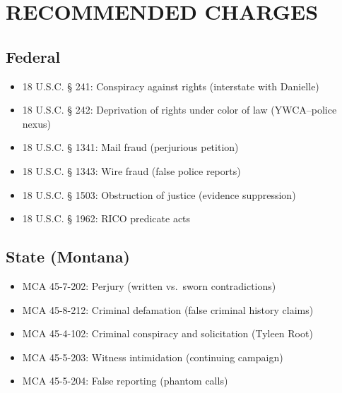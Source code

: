 \documentclass[12pt,oneside]{article}
\begin{document}
\section*{RECOMMENDED CHARGES}

\subsection*{Federal}

\begin{itemize}

\item 18 U.S.C. § 241: Conspiracy against rights (interstate with Danielle)

\item 18 U.S.C. § 242: Deprivation of rights under color of law (YWCA--police nexus)

\item 18 U.S.C. § 1341: Mail fraud (perjurious petition)

\item 18 U.S.C. § 1343: Wire fraud (false police reports)

\item 18 U.S.C. § 1503: Obstruction of justice (evidence suppression)

\item 18 U.S.C. § 1962: RICO predicate acts

\end{itemize}

\subsection*{State (Montana)}

\begin{itemize}

\item MCA 45-7-202: Perjury (written vs.\ sworn contradictions)

\item MCA 45-8-212: Criminal defamation (false criminal history claims)

\item MCA 45-4-102: Criminal conspiracy and solicitation (Tyleen Root)

\item MCA 45-5-203: Witness intimidation (continuing campaign)

\item MCA 45-5-204: False reporting (phantom calls)

\end{itemize}
\end{document}
